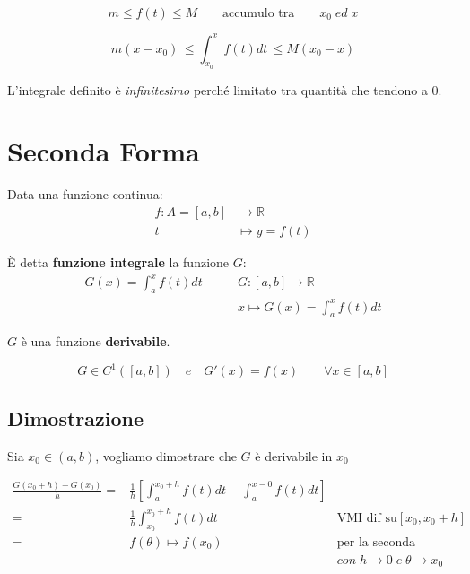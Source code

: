 \documentclass[../dimostrazioni]{subfiles}
\begin{document}
                \[m \leqslant f(t) \leqslant M \qquad \text {accumulo tra} \qquad x_0 \; ed \; x \]

                \[m(x-x_0) \, \leqslant \int_{x_0}^{x} f(t) dt \, \leqslant M(x_0-x) \]

                L'integrale definito è \emph{infinitesimo} perché limitato tra quantità che tendono a 0.




    \section*{Seconda Forma}

        Data una funzione continua:
        \begin{align*}
            f : A = [a, b] &\longrightarrow \mathbb{R}\\
            t &\longmapsto y = f(t) 
        \end{align*}

        È detta \textbf{funzione integrale} la funzione \(G\):
        \begin{align*}
            G(x) = \int_{a}^{x} f(t) dt \qquad   &{G : [a, b] \longmapsto \mathbb{R}} \\
            &{x \longmapsto G(x) = \int_{a}^{x} f(t) dt}
        \end{align*}

        \(G\) è una funzione \textbf{derivabile}.

        \[G \in C^{1}([a, b]) \quad e \quad G'(x) = f(x) \qquad \forall x \in [a,b] \]
        
            \subsection*{Dimostrazione}

                Sia \(x_0 \in (a,b) \), vogliamo dimostrare che \(G\) è derivabile in \(x_0\)

                \begin{align*}
                    \frac{G(x_0+h) - G(x_0)}{h} =& \frac{1}{h} \left[ \int_{a}^{x_0+h} f(t) dt - \int_{a}^{x-0} f(t)dt \right] \\
                    =& \frac{1}{h} \int_{x_0}^{x_0+h}f(t) dt & \text{VMI dif su} [x_0, {x_0} +h]\\
                    =& f(\theta) \longmapsto f(x_0)  & \text{per la seconda proprietà del VMI}& \\
                    &                                &  con \; h \rightarrow 0 \; e \; \theta \rightarrow x_0&
                \end{align*}
\end{document}
